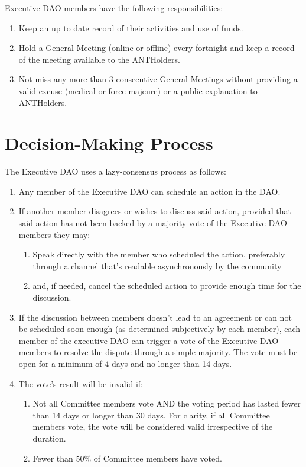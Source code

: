 Executive \ac{DAO} members have the following responsibilities:
\begin{enumerate}
	\item Keep an up to date record of their activities and use of funds.
	\item Hold a General Meeting (online or offline) every fortnight and keep a record of the meeting available to the \glspl{ANTHolder}.
	\item Not miss any more than 3 consecutive General Meetings without providing a valid excuse (medical or force majeure) or a public explanation to \glspl{ANTHolder}.
\end{enumerate}


\section{Decision-Making Process} 

The Executive \ac{DAO} uses a lazy-consensus process as follows:
\begin{enumerate}
	
	\item Any member of the Executive \ac{DAO} can schedule an action in the \ac{DAO}.
	\item If another member disagrees or wishes to discuss said action, provided that said action has not been backed by a majority vote of the Executive \ac{DAO} members they may:
	\begin{enumerate}
		\item Speak directly with the member who scheduled the action, preferably through a channel that’s readable asynchronously by the community
		\item and, if needed, cancel the scheduled action to provide enough time for the discussion.
	\end{enumerate}
	
	\item If the discussion between members doesn’t lead to an agreement or can not be scheduled soon enough (as determined subjectively by each member), each member of the executive \ac{DAO} can trigger a vote of the Executive \ac{DAO} members to resolve the dispute through a simple majority.
	The vote must be open for a minimum of 4 days and no longer than 14 days.
	\item The vote’s result will be invalid if:
	\begin{enumerate}
		\item Not all Committee members vote AND the voting period has lasted fewer than 14 days or longer than 30 days.
		For clarity, if all Committee members vote, the vote will be considered valid irrespective of the duration.
		\item Fewer than 50\% of Committee members have voted.
	\end{enumerate}

\end{enumerate}


